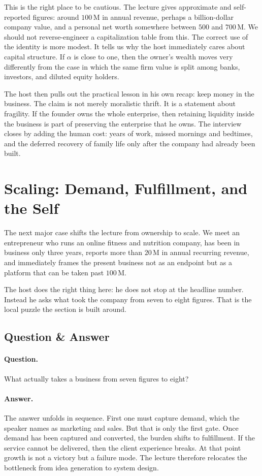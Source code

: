 This is the right place to be cautious. The lecture gives approximate and self-reported figures: around $100\,\mathrm{M}$ in annual revenue, perhaps a billion-dollar company value, and a personal net worth somewhere between $500$ and $700\,\mathrm{M}$. We should not reverse-engineer a capitalization table from this. The correct use of the identity is more modest. It tells us why the host immediately cares about capital structure. If $\alpha$ is close to one, then the owner's wealth moves very differently from the case in which the same firm value is split among banks, investors, and diluted equity holders.

The host then pulls out the practical lesson in his own recap: keep money in the business. The claim is not merely moralistic thrift. It is a statement about fragility. If the founder owns the whole enterprise, then retaining liquidity inside the business is part of preserving the enterprise that he owns. The interview closes by adding the human cost: years of work, missed mornings and bedtimes, and the deferred recovery of family life only after the company had already been built.

\section{Scaling: Demand, Fulfillment, and the Self}

The next major case shifts the lecture from ownership to scale. We meet an entrepreneur who runs an online fitness and nutrition company, has been in business only three years, reports more than $20\,\mathrm{M}$ in annual recurring revenue, and immediately frames the present business not as an endpoint but as a platform that can be taken past $100\,\mathrm{M}$.

The host does the right thing here: he does not stop at the headline number. Instead he asks what took the company from seven to eight figures. That is the local puzzle the section is built around.

\subsection{Question \& Answer}

\paragraph{Question.} What actually takes a business from seven figures to eight?

\paragraph{Answer.} The answer unfolds in sequence. First one must capture demand, which the speaker names as marketing and sales. But that is only the first gate. Once demand has been captured and converted, the burden shifts to fulfillment. If the service cannot be delivered, then the client experience breaks. At that point growth is not a victory but a failure mode. The lecture therefore relocates the bottleneck from idea generation to system design.

